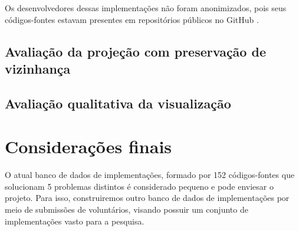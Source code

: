 	Os desenvolvedores dessas implementações não foram anonimizados, pois seus
	códigos-fontes estavam presentes em repositórios públicos no GitHub \cite{github}.
	
	

\subsection{Avaliação da projeção com preservação de vizinhança}


\subsection{Avaliação qualitativa da visualização}



	\section{Considerações finais}
	
		O atual banco de dados de implementações, formado por 152 códigos-fontes que
		solucionam 5 problemas distintos é considerado pequeno e pode enviesar o
		projeto. Para isso, construiremos outro banco de dados de implementações
		por meio de submissões de voluntários, visando possuir um conjunto de
		implementações vasto para a pesquisa.
